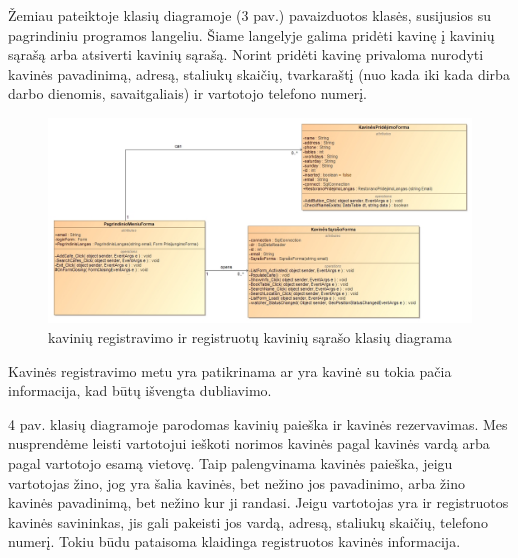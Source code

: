 \documentclass{VUMIFPSkursinis}
\begin{document}
{{{{{\pagebreak
Žemiau pateiktoje klasių diagramoje (3 pav.) pavaizduotos klasės, susijusios su pagrindiniu programos langeliu. Šiame langelyje galima pridėti kavinę į kavinių sąrašą arba atsiverti kavinių sąrašą. Norint pridėti kavinę privaloma nurodyti kavinės pavadinimą, adresą, staliukų skaičių, tvarkaraštį (nuo kada iki kada dirba darbo dienomis, savaitgaliais) ir vartotojo telefono numerį.
\newline
\newline
\newline
\newline
\newline
\newline
\begin{figure}[H]
    \centering
    \includegraphics[width=\textwidth,height=\textheight,keepaspectratio]{img/MainMenu_AddRestaurant_ListForm} 
    \caption{kavinių registravimo ir registruotų kavinių sąrašo klasių diagrama}
    \label{img:MainMenu_AddRestaurant_ListForm}
\end{figure}

Kavinės registravimo metu yra patikrinama ar yra kavinė su tokia pačia informacija, kad būtų išvengta dubliavimo.

\pagebreak
4 pav. klasių diagramoje parodomas kavinių paieška ir kavinės rezervavimas. Mes nusprendėme leisti vartotojui ieškoti norimos kavinės pagal kavinės vardą arba pagal vartotojo esamą vietovę. Taip palengvinama kavinės paieška, jeigu vartotojas žino, jog yra šalia kavinės, bet nežino jos pavadinimo, arba žino kavinės pavadinimą, bet nežino kur ji randasi. Jeigu vartotojas yra ir registruotos kavinės savininkas, jis  gali pakeisti jos vardą, adresą, staliukų skaičių, telefono numerį. Tokiu būdu pataisoma klaidinga registruotos kavinės informacija.
\newline
\newline
\newline
\newline
\newline
\newline
\newline
\newline

}}}}}
\end{document}
